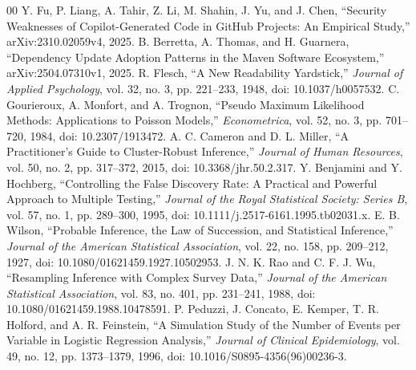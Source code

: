 \documentclass[conference]{IEEEtran}
\begin{document}
\begin{thebibliography}{00}
Y. Fu, P. Liang, A. Tahir, Z. Li, M. Shahin, J. Yu, and J. Chen, ``Security Weaknesses of Copilot-Generated Code in GitHub Projects: An Empirical Study,'' arXiv:2310.02059v4, 2025.
B. Berretta, A. Thomas, and H. Guarnera, ``Dependency Update Adoption Patterns in the Maven Software Ecosystem,'' arXiv:2504.07310v1, 2025.
R. Flesch, ``A New Readability Yardstick,'' \emph{Journal of Applied Psychology}, vol. 32, no. 3, pp. 221--233, 1948, doi: 10.1037/h0057532.
C. Gourieroux, A. Monfort, and A. Trognon, ``Pseudo Maximum Likelihood Methods: Applications to Poisson Models,'' \emph{Econometrica}, vol. 52, no. 3, pp. 701--720, 1984, doi: 10.2307/1913472.
A. C. Cameron and D. L. Miller, ``A Practitioner's Guide to Cluster-Robust Inference,'' \emph{Journal of Human Resources}, vol. 50, no. 2, pp. 317--372, 2015, doi: 10.3368/jhr.50.2.317.
Y. Benjamini and Y. Hochberg, ``Controlling the False Discovery Rate: A Practical and Powerful Approach to Multiple Testing,'' \emph{Journal of the Royal Statistical Society: Series B}, vol. 57, no. 1, pp. 289--300, 1995, doi: 10.1111/j.2517-6161.1995.tb02031.x.
E. B. Wilson, ``Probable Inference, the Law of Succession, and Statistical Inference,'' \emph{Journal of the American Statistical Association}, vol. 22, no. 158, pp. 209--212, 1927, doi: 10.1080/01621459.1927.10502953.
J. N. K. Rao and C. F. J. Wu, ``Resampling Inference with Complex Survey Data,'' \emph{Journal of the American Statistical Association}, vol. 83, no. 401, pp. 231--241, 1988, doi: 10.1080/01621459.1988.10478591.
P. Peduzzi, J. Concato, E. Kemper, T. R. Holford, and A. R. Feinstein, ``A Simulation Study of the Number of Events per Variable in Logistic Regression Analysis,'' \emph{Journal of Clinical Epidemiology}, vol. 49, no. 12, pp. 1373--1379, 1996, doi: 10.1016/S0895-4356(96)00236-3.
\end{thebibliography}
\end{document}
